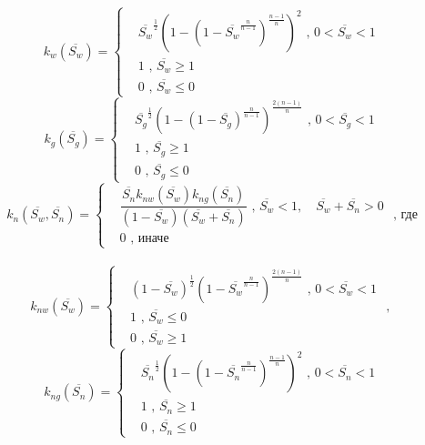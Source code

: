 \begin{equation*}
  k_{w}(\overline{S_w})=
  \begin{cases}
  &\overline{S_w}^\frac{1}{2} \left( 1-\left( 1-\overline{S_w}^\frac{n}{n-1} \right) ^\frac{n-1}{n} \right) ^2
  \text{ , $0<\overline{S_w}<1$}\\
  &1 \text{ , $\overline{S_w}\ge 1$}\\
  &0 \text{ , $\overline{S_w}\le 0$}
\end{cases} 
\end{equation*}
\begin{equation*}
  k_{g}(\overline{S_g})=
  \begin{cases}
  &\overline{S_g}^\frac{1}{2} \left( 1-\left ( 1-\overline{S_g} \right) ^\frac{n}{n-1} \right) ^\frac{2(n-1)}{n}
  \text{ , $0<\overline{S_g}<1$}\\
  &1 \text{ , $\overline{S_g}\ge 1$}\\
  &0 \text{ , $\overline{S_g}\le 0$}
  \end{cases} 
\end{equation*}
\begin{equation*}
  k_{n}(\overline{S_w},\overline{S_n})=
  \begin{cases}
  &\dfrac{\overline{S_n} k_{nw}(\overline{S_w})k_{ng}(\overline{S_n})}{(1-\overline{S_w})(\overline{S_w}+\overline{S_n})}
  \text{ , $\overline{S_w}<1, \quad \overline{S_w}+\overline{S_n} >0$}\\
  &0 \text{ , иначе}
  \end{cases}\text { , где}
\end{equation*}\\
\begin{equation*}
  k_{nw}(\overline{S_w})=
  \begin{cases}
  &(1-\overline{S_w})^\frac{1}{2} \left(1-\overline{S_w}^\frac{n}{n-1} \right) ^\frac{2(n-1)}{n}
  \text{ , $0<\overline{S_w}<1$}\\
  &1 \text{ , $\overline{S_w}\le 0$}\\
  &0 \text{ , $\overline{S_w}\ge 1$}
  \end{cases}\text { , }
\end{equation*}
\begin{equation*}
  k_{ng}(\overline{S_n})=
  \begin{cases}
  &\overline{S_n}^\frac{1}{2} \left( 1-\left( 1-\overline{S_n}^\frac{n}{n-1} \right) ^\frac{n-1}{n} \right) ^2 
  \text{ , $0<\overline{S_n}<1$}\\
  &1 \text{ , $\overline{S_n}\ge 1$}\\
  &0 \text{ ,  $\overline{S_n}\le 0$}
\end{cases}
\end{equation*}
 

